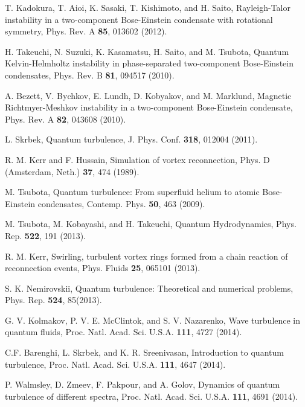 \documentclass[12pt,a4paper]{jbook}
\begin{document}
\begin{thebibliography}{99}
		T. Kadokura, T. Aioi, K. Sasaki, T. Kishimoto, and H. Saito,
		Rayleigh-Talor instability in a two-component Bose-Einstein
		condensate with rotational symmetry,
		Phys. Rev. A \textbf{85}, 013602 (2012).

		H. Takeuchi, N. Suzuki, K. Kasamatsu, H. Saito, and M. Tsubota,
		Quantum Kelvin-Helmholtz instability in phase-separated
		two-component Bose-Einstein condensates,
		Phys. Rev. B \textbf{81}, 094517 (2010).

		A. Bezett, V. Bychkov, E. Lundh, D. Kobyakov, and M. Marklund,
		Magnetic Richtmyer-Meshkov instability in a two-component
		Bose-Einstein condensate,
		Phys. Rev. A \textbf{82}, 043608 (2010).

		L. Skrbek,
		Quantum turbulence,
		J. Phys. Conf. \textbf{318}, 012004 (2011).

		R. M. Kerr and F. Hussain,
		Simulation of vortex reconnection, 
		Phys. D (Amsterdam, Neth.) \textbf{37}, 474 (1989).

		M. Tsubota,
		Quantum turbulence: From superfluid helium to atomic Bose-Einstein condensates,
		Contemp. Phys. \textbf{50}, 463 (2009).

        M. Tsubota, M. Kobayashi, and H. Takeuchi,
        Quantum Hydrodynamics,
        Phys. Rep. \textbf{522}, 191 (2013).

		R. M. Kerr,
		Swirling, turbulent vortex rings formed from a chain reaction of reconnection events,
		Phys. Fluids \textbf{25}, 065101 (2013).

		S. K. Nemirovskii,
		Quantum turbulence: Theoretical and numerical problems,
		Phys. Rep. \textbf{524}, 85(2013).

		G. V. Kolmakov, P. V. E. McClintok, and S. V. Nazarenko,
		Wave turbulence in quantum fluids,
		Proc. Natl. Acad. Sci. U.S.A. \textbf{111}, 4727 (2014).

		C.F. Barenghi, L. Skrbek, and K. R. Sreenivasan,
		Introduction to quantum turbulence,
		Proc. Natl. Acad. Sci. U.S.A. \textbf{111}, 4647 (2014).

		P. Walmsley, D. Zmeev, F. Pakpour, and A. Golov,
		Dynamics of quantum turbulence of different spectra,
		Proc. Natl. Acad. Sci. U.S.A. \textbf{111}, 4691 (2014).


\end{thebibliography}
\end{document}
